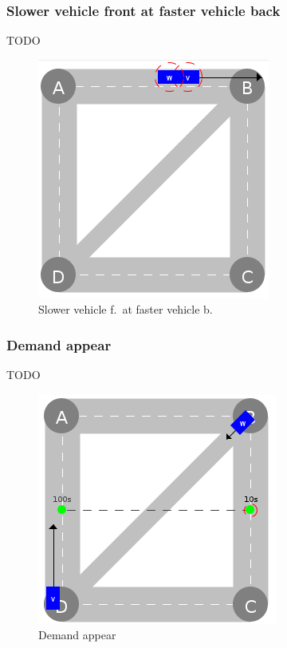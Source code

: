 \documentclass{IEEEtran}
\begin{document}
    \subsubsection{Slower vehicle front at faster vehicle back}
    TODO

    \begin{figure}[htbp]
        \centering
        \includegraphics[scale=0.5]{../../events/slower-vehicle-front-at-faster-vehicle-back.png}
        \caption{Slower vehicle f.\ at faster vehicle b.}
        \label{fig:slower-vehicle-front-at-faster-vehicle-back}
    \end{figure}

    \subsubsection{Demand appear}
    TODO

    \begin{figure}[htbp]
        \centering
        \includegraphics[scale=0.5]{../../events/demand.png}
        \caption{Demand appear}
        \label{fig:demand}
    \end{figure}
\end{document}
